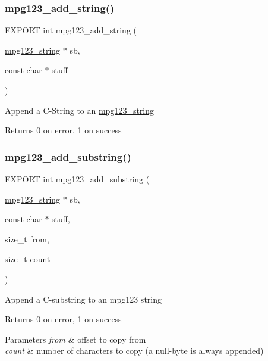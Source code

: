 \subsubsection{\texorpdfstring{mpg123\+\_\+add\+\_\+string()}{mpg123\_add\_string()}}
{\footnotesize\ttfamily E\+X\+P\+O\+RT int mpg123\+\_\+add\+\_\+string (\begin{DoxyParamCaption}\item[{\hyperlink{structmpg123__string}{mpg123\+\_\+string} $\ast$}]{sb,  }\item[{const char $\ast$}]{stuff }\end{DoxyParamCaption})}

Append a C-\/\+String to an \hyperlink{structmpg123__string}{mpg123\+\_\+string} \begin{DoxyReturn}{Returns}
0 on error, 1 on success 
\end{DoxyReturn}
\mbox{\label{group__mpg123__metadata_gac594f05797208607698ea7c3c6d1b6f3}} 
\subsubsection{\texorpdfstring{mpg123\+\_\+add\+\_\+substring()}{mpg123\_add\_substring()}}
{\footnotesize\ttfamily E\+X\+P\+O\+RT int mpg123\+\_\+add\+\_\+substring (\begin{DoxyParamCaption}\item[{\hyperlink{structmpg123__string}{mpg123\+\_\+string} $\ast$}]{sb,  }\item[{const char $\ast$}]{stuff,  }\item[{size\+\_\+t}]{from,  }\item[{size\+\_\+t}]{count }\end{DoxyParamCaption})}

Append a C-\/substring to an mpg123 string \begin{DoxyReturn}{Returns}
0 on error, 1 on success 
\end{DoxyReturn}

\begin{DoxyParams}{Parameters}
{\em from} & offset to copy from \\
\hline
{\em count} & number of characters to copy (a null-\/byte is always appended) \\
\hline
\end{DoxyParams}
\mbox{\label{group__mpg123__metadata_ga8b85a7dc7b0407eb656d3f702e74e7ae}} 
